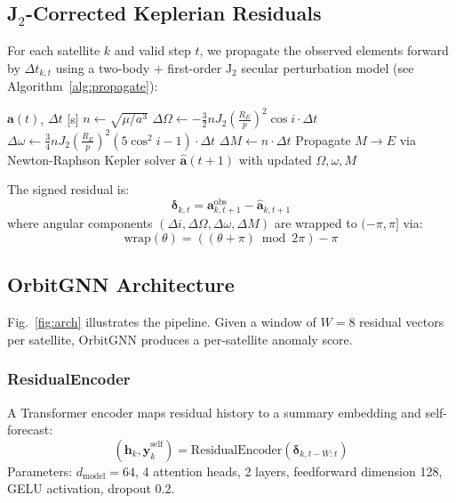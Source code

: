 \documentclass[conference]{IEEEtran}
\begin{document}
\subsection{J$_2$-Corrected Keplerian Residuals}

For each satellite $k$ and valid step $t$, we propagate the observed
elements forward by $\Delta t_{k,t}$ using a two-body + first-order
J$_2$ secular perturbation model (see Algorithm~\ref{alg:propagate}):

\begin{algorithm}
\caption{J$_2$+Kepler Propagation (per step)}
\label{alg:propagate}
\begin{algorithmic}[1]
  \Require $\mathbf{a}(t)$, $\Delta t$ [s]
  \State $n \leftarrow \sqrt{\mu / a^3}$ 
  \State $\Delta\Omega \leftarrow -\tfrac{3}{2}n J_2 \left(\tfrac{R_E}{p}\right)^2 \cos i \cdot \Delta t$
  \State $\Delta\omega  \leftarrow \tfrac{3}{4}n J_2 \left(\tfrac{R_E}{p}\right)^2 (5\cos^2 i-1) \cdot \Delta t$
  \State $\Delta M      \leftarrow n \cdot \Delta t$
  \State Propagate $M \to E$ via Newton-Raphson Kepler solver
  \State \Return $\hat{\mathbf{a}}(t{+}1)$ with updated $\Omega, \omega, M$
\end{algorithmic}
\end{algorithm}

The signed residual is:
\begin{equation}
  \boldsymbol{\delta}_{k,t} = \mathbf{a}^{\text{obs}}_{k,t+1} -
                               \hat{\mathbf{a}}_{k,t+1}
\end{equation}
where angular components $(\Delta i, \Delta\Omega, \Delta\omega,
\Delta M)$ are wrapped to $(-\pi, \pi]$ via:
\begin{equation}
  \text{wrap}(\theta) = ((\theta + \pi) \bmod 2\pi) - \pi
\end{equation}

\subsection{OrbitGNN Architecture}

Fig.~\ref{fig:arch} illustrates the pipeline. Given a window of
$W = 8$ residual vectors per satellite, OrbitGNN produces a per-satellite
anomaly score.

\subsubsection{ResidualEncoder}
A Transformer encoder maps residual history to a summary embedding and
self-forecast:
\begin{equation}
  (\mathbf{h}_k, \hat{\mathbf{y}}^{\text{self}}_k) =
  \text{ResidualEncoder}(\boldsymbol{\delta}_{k,t-W:t})
\end{equation}
Parameters: $d_\text{model}=64$, 4 attention heads, 2 layers,
feedforward dimension 128, GELU activation, dropout 0.2.
\end{document}
